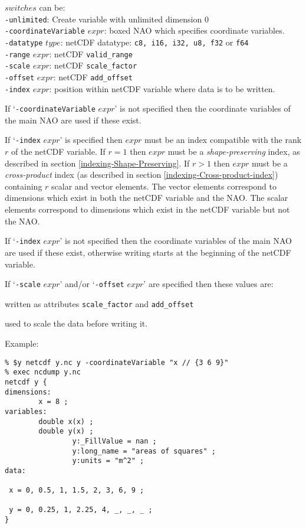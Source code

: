   $switches$ can be:
  \\
  \texttt{-unlimited}: Create variable with unlimited dimension 0
  \\
  \texttt{-coordinateVariable} 
  $expr$: boxed NAO which specifies coordinate variables.
  \\
  \texttt{-datatype} 
  $type$: netCDF datatype: 
  \texttt{c8, i16, i32, u8, f32} or 
  \texttt{f64}
  \\
  \texttt{-range} 
  $expr$: netCDF 
  \texttt{valid\_range}
  \\
  \texttt{-scale} 
  $expr$: netCDF 
  \texttt{scale\_factor}
  \\
  \texttt{-offset} 
  $expr$: netCDF 
  \texttt{add\_offset}
  \\
  \texttt{-index} 
  $expr$: position within netCDF variable where data is to be
  written.
  

If `\texttt{-coordinateVariable} 
  $expr$' is not specified then the coordinate variables
  of the main NAO are used if these exist.
  

If `\texttt{-index} 
  $expr$' is specified then 
  $expr$ must be an index compatible with the rank 
  $r$ of the netCDF variable.
If $r = 1$ then $expr$ must be a {\em shape-preserving} index,
as described in section \ref{indexing-Shape-Preserving}.
If $r > 1$ then $expr$ must be a {\em cross-product} index
(as described in section \ref{indexing-Cross-product-index})
containing $r$ scalar and vector elements.
The vector elements
  correspond to dimensions which exist in both the netCDF variable and
  the NAO. The scalar elements correspond to dimensions which exist in
  the netCDF variable but not the NAO.
  

If `\texttt{-index} 
  $expr$' is not specified then the coordinate variables
  of the main NAO are used if these exist, otherwise writing starts at
  the beginning of the netCDF variable.
  

If `\texttt{-scale} 
  $expr$' and/or `\texttt{-offset} 
  $expr$' are specified then these values are:
\begin{bullets}
    \item written as attributes 
    \texttt{scale\_factor} and 
    \texttt{add\_offset}
    \item used to scale the data before writing it.
\end{bullets}

Example:
  \begin{verbatim}
% $y netcdf y.nc y -coordinateVariable "x // {3 6 9}"
% exec ncdump y.nc
netcdf y {
dimensions:
        x = 8 ;
variables:
        double x(x) ;
        double y(x) ;
                y:_FillValue = nan ;
                y:long_name = "areas of squares" ;
                y:units = "m^2" ;
data:

 x = 0, 0.5, 1, 1.5, 2, 3, 6, 9 ;

 y = 0, 0.25, 1, 2.25, 4, _, _, _ ;
}
\end{verbatim}

